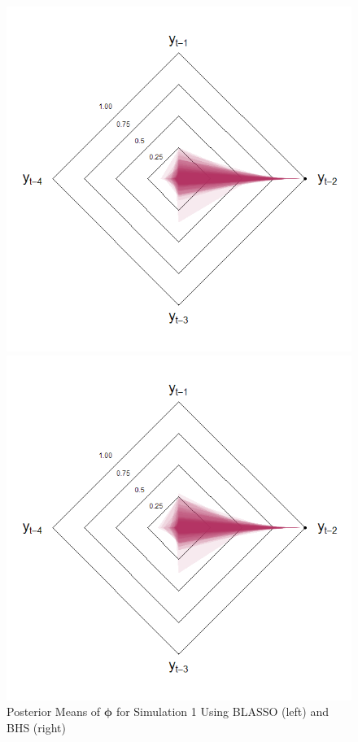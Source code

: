 \begin{figure}[!h]
\centering
\caption{Posterior Means of $\bm{\phi}$ for Simulation 1 Using BLASSO (left) and BHS (right)}
\begin{minipage}[h]{0.3\textwidth}
\includegraphics[scale=0.31]{blassodlp}
\end{minipage} \hspace{0.12\textwidth}
\begin{minipage}[h]{0.3\textwidth}
\includegraphics[scale=0.31]{hsdlp}
\end{minipage}
\label{fig:dirichlet1}
\end{figure}


